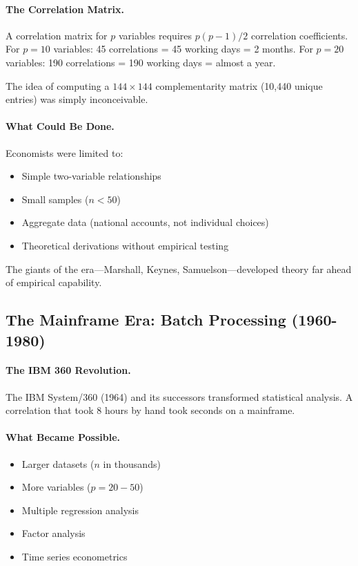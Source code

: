 \paragraph{The Correlation Matrix.}
A correlation matrix for $p$ variables requires $p(p-1)/2$ correlation coefficients.
For $p = 10$ variables: 45 correlations = 45 working days = 2 months.
For $p = 20$ variables: 190 correlations = 190 working days = almost a year.

The idea of computing a $144 \times 144$ complementarity matrix
(10,440 unique entries) was simply inconceivable.

\paragraph{What Could Be Done.}
Economists were limited to:
\begin{itemize}
  \item Simple two-variable relationships
  \item Small samples ($n < 50$)
  \item Aggregate data (national accounts, not individual choices)
  \item Theoretical derivations without empirical testing
\end{itemize}

The giants of the era---Marshall, Keynes, Samuelson---developed theory
far ahead of empirical capability.

\subsection{The Mainframe Era: Batch Processing (1960-1980)}

\paragraph{The IBM 360 Revolution.}
The IBM System/360 (1964) and its successors transformed statistical analysis.
A correlation that took 8 hours by hand took seconds on a mainframe.

\paragraph{What Became Possible.}
\begin{itemize}
  \item Larger datasets ($n$ in thousands)
  \item More variables ($p = 20-50$)
  \item Multiple regression analysis
  \item Factor analysis
  \item Time series econometrics
\end{itemize}

